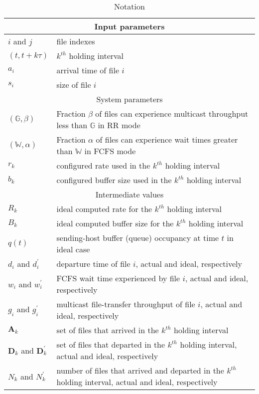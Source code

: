 \begin{table*}[!ht]
\centering
\caption{Notation}
\begin{tabular}{|l|p{12.5cm}|}
\hline
\multicolumn{2}{|c|}{Input parameters}\\ \hline
$i$ and $j$ & file indexes\\ \hline
$(t,t+k\tau)$ & $k^{th}$ holding interval \\ \hline
$a_i$ & arrival time of file $i$ \\ \hline
$s_i$ & size of file $i$\\ \hline
\multicolumn{2}{|c|}{System parameters}\\ \hline
$(\mathbb{G},\beta)$ & Fraction $\beta$ of files can experience multicast throughput less than $\mathbb{G}$ in RR mode\\ \hline
$(\mathbb{W},\alpha)$ & Fraction $\alpha$ of files can experience wait times greater than $\mathbb{W}$ in FCFS mode\\ \hline
$r_k$ & configured rate used in the $k^{th}$ holding interval\\ \hline
$b_k$ & configured buffer size used in the $k^{th}$ holding interval \\ \hline
\multicolumn{2}{|c|}{Intermediate values}\\ \hline
$R_k$ & ideal computed rate for the $k^{th}$ holding interval\\ \hline
$B_k$ & ideal computed buffer size for the $k^{th}$ holding interval \\ \hline
$q(t)$ & sending-host buffer (queue) occupancy at time $t$ in ideal case \\ \hline
$d_i$ and $d^{\prime}_i$  & departure time of file $i$, actual and ideal, respectively\\ \hline
$w_i$ and $w^{\prime}_i$ & FCFS wait time experienced by file $i$, actual and ideal, respectively \\ \hline
$g_i$ and $g^{\prime}_i$ & multicast file-transfer throughput of file $i$, actual and ideal, respectively\\ \hline
$\textbf{A}_k$ & set of files that arrived in the $k^{th}$ holding interval \\ \hline
$\textbf{D}_k$ and $\textbf{D}^{\prime}_k $& set of files that departed in the $k^{th}$ holding interval, actual and ideal, respectively \\ \hline
$N_k$ and $N^{\prime}_k $ & number of files that arrived and departed in the $k^{th}$ holding interval, actual and ideal, respectively \\ \hline

\end{tabular}
\end{table*}
